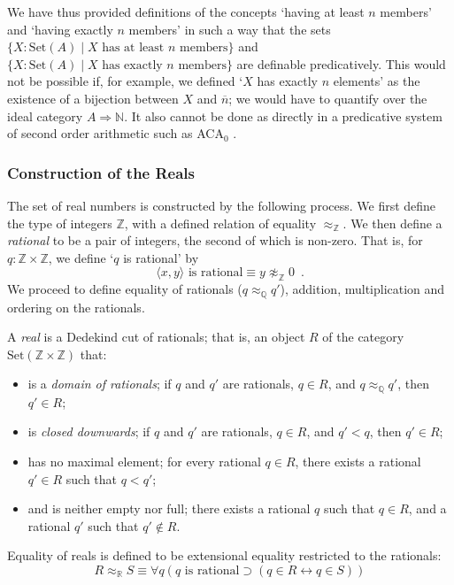 \documentclass[acmtocl]{acmtrans2m}
\newcommand{\Set}[1]{\mathrm{Set} \left( {#1} \right)}
\newcommand{\boldarrow}{\Rightarrow}
\begin{document}
We have thus provided definitions of the concepts `having at least $n$ members' and `having exactly $n$ members' in such a way that the sets
$\{ X : \Set{A} \mid X \mbox{ has at least } n \mbox{ members} \}$ and $\{ X : \Set{A} \mid X \mbox{ has exactly } n \mbox{ members} \}$
are definable predicatively.  This would not be possible if, for example, we defined `$X$ has exactly $n$ elements' as the existence
of a bijection between $X$ and $\overline{n}$; we would have to quantify over the ideal category $A \boldarrow \mathbb{N}$.  It also cannot be
done as directly in a predicative system of second order arithmetic
such as ACA$_0$ \cite{simpson:sosoa}.

\subsubsection{Construction of the Reals}

The set of real numbers is constructed by the following process. We
first define the type of integers $\mathbb{Z}$, with a defined relation of equality $\approx_\mathbb{Z}$.
We then define a
\emph{rational} to be a pair of integers, the second of which is non-zero.  That is, for $q : \mathbb{Z} \times \mathbb{Z}$, we define `$q$ is rational' by
\[ \langle x,y \rangle \mbox{ is rational} \equiv y \not\approx_\mathbb{Z} 0 \enspace . \]
We proceed to define equality of rationals ($q \approx_\mathbb{Q} q'$), addition, multiplication and ordering on the rationals.

A \emph{real} is a Dedekind cut of rationals; that is, an object $R$
of the category $\Set{\mathbb{Z} \times \mathbb{Z}}$ that:
\begin{itemize}
\item
is a \emph{domain of rationals}; if $q$ and $q'$ are rationals, $q
\in R$, and $q \approx_\mathbb{Q} q'$, then $q' \in R$;
\item
is \emph{closed downwards}; if $q$ and $q'$ are rationals, $q \in R$, and $q' < q$, then $q' \in R$;
\item
has no maximal element; for every rational $q \in R$, there exists a rational $q' \in R$ such that $q < q'$;
\item
and is neither empty nor full; there exists a rational $q$ such that $q \in R$, and a rational $q'$ such that $q' \notin R$.
\end{itemize}
Equality of reals is defined to be extensional equality restricted to the rationals:
\[ R \approx_\mathbb{R} S \equiv \forall q (q \mbox{ is rational} \supset (q \in R \leftrightarrow q \in S)) \]
\end{document}
